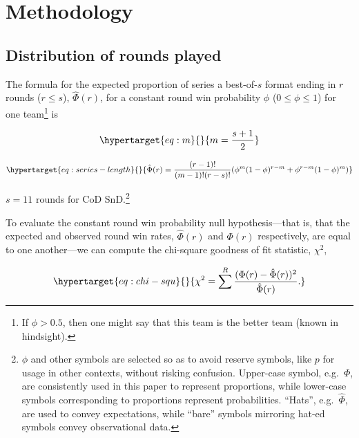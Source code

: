\documentclass{article}
\begin{document}
\hypertarget{methodology}{%
\section{Methodology}\label{methodology}}

\hypertarget{sec:method-rounds-played}{%
\subsection{Distribution of rounds
played}\label{sec:method-rounds-played}}

The formula for the expected proportion of series a best-of-\(s\) format
ending in \(r\) rounds (\(r \leq s\)), \(\hat{\Phi}(r)\), for a constant
round win probability \(\phi\) (\(0 \leq \phi \leq 1\)) for one
team\footnote{If \(\phi > 0.5\), then one might say that this team is
  the better team (known in hindsight).} is

\begin{equation}\protect\hypertarget{eq:m}{}{
m = \frac{s + 1}{2}
}\label{eq:m}\end{equation}

\begin{equation}\protect\hypertarget{eq:series-length}{}{
\hat{\Phi}(r) = \frac{(r - 1)!}{(m - 1)!(r - s)!}(\phi^{m}(1 - \phi)^{r - m} + \phi^{r - m}(1 - \phi)^m)
}\label{eq:series-length}\end{equation}

\(s = 11\) rounds for CoD SnD.\footnote{\(\phi\) and other symbols are
  selected so as to avoid reserve symbols, like \(p\) for usage in other
  contexts, without risking confusion. Upper-case symbol, e.g.~\(\Phi\),
  are consistently used in this paper to represent proportions, while
  lower-case symbols corresponding to proportions represent
  probabilities. ``Hats'', e.g.~\(\hat{\Phi}\), are used to convey
  expectations, while ``bare'' symbols mirroring hat-ed symbols convey
  observational data.}

To evaluate the constant round win probability null hypothesis---that
is, that the expected and observed round win rates, \(\hat{\Phi}(r)\)
and \(\Phi(r)\) respectively, are equal to one another---we can compute
the chi-square goodness of fit statistic, \(\chi^2\),

\begin{equation}\protect\hypertarget{eq:chi-squ}{}{
\chi^2 = \sum^R \frac{(\Phi(r) - \hat{\Phi}(r))^2}{\hat{\Phi}(r)}.
}\label{eq:chi-squ}\end{equation}
\end{document}
